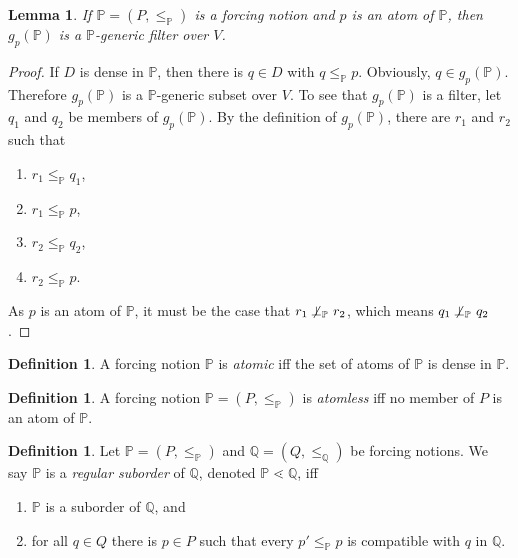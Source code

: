 \documentclass[12pt, twoside]{memoir}
\numberwithin{equation}{section}
\newtheorem{lem}[thm]{Lemma}
\theoremstyle{definition}
\newtheorem{defi}[thm]{Definition}
\theoremstyle{remark}
\theoremstyle{definition}
\theoremstyle{definition}
\theoremstyle{definition}
\theoremstyle{remark}
\begin{document}
\begin{lem}\label{gpgeneric}
If $\mathbb{P} = (P, \leq_{\mathbb{P}})$ is a forcing notion and $p$ is an atom of $\mathbb{P}$, then $g_p (\mathbb{P})$ is a $\mathbb{P}$-generic filter over $V$.
\end{lem}

\begin{proof}
If $D$ is dense in $\mathbb{P}$, then there is $q \in D$ with $q \leq_{\mathbb{P}} p$. Obviously, $q \in g_p (\mathbb{P})$. Therefore $g_p (\mathbb{P})$ is a $\mathbb{P}$-generic subset over $V$. To see that $g_p (\mathbb{P})$ is a filter, let $q_1$ and $q_2$ be members of $g_p (\mathbb{P})$. By the definition of $g_p (\mathbb{P})$, there are $r_1$ and $r_2$ such that 
\begin{enumerate}[label=(\alph*)]
    \item $r_1 \leq_{\mathbb{P}} q_1$, 
    \item $r_1 \leq_{\mathbb{P}} p$,
    \item $r_2 \leq_{\mathbb{P}} q_2$,
    \item $r_2 \leq_{\mathbb{P}} p$.
\end{enumerate}
As $p$ is an atom of $\mathbb{P}$, it must be the case that $r_1 \not \! \! \bot_{\mathbb{P}} \ r_2$, which means $q_1 \not \! \! \bot_{\mathbb{P}} \ q_2$.
\end{proof}

\begin{defi}
A forcing notion $\mathbb{P}$ is \emph{atomic} iff the set of atoms of $\mathbb{P}$ is dense in $\mathbb{P}$.
\end{defi}

\begin{defi}
A forcing notion $\mathbb{P} = (P, \leq_{\mathbb{P}})$ is \emph{atomless} iff no member of $P$ is an atom of $\mathbb{P}$.
\end{defi}

\begin{defi}
Let $\mathbb{P} = (P, \leq_{\mathbb{P}})$ and $\mathbb{Q} = (Q, \leq_{\mathbb{Q}})$ be forcing notions. We say $\mathbb{P}$ is a \emph{regular suborder} of $\mathbb{Q}$, denoted $\mathbb{P} \lessdot \mathbb{Q}$, iff 
\begin{enumerate}[label=(\alph*)]
    \item $\mathbb{P}$ is a suborder of $\mathbb{Q}$, and
    \item for all $q \in Q$ there is $p \in P$ such that every $p' \leq_{\mathbb{P}} p$ is compatible with $q$ in $\mathbb{Q}$.
\end{enumerate}
\end{defi}
\end{document}
